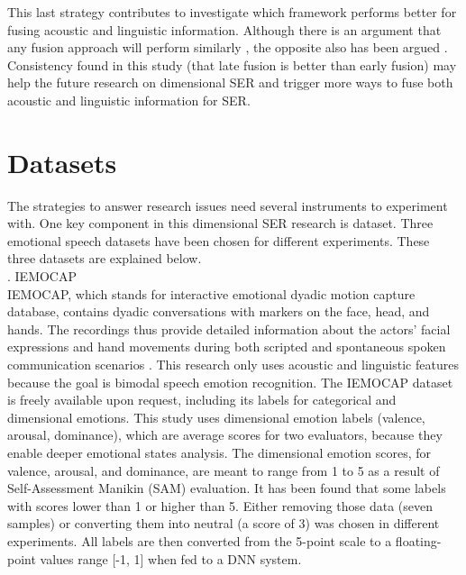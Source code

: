 {This last strategy contributes to investigate which framework performs better
for fusing acoustic and linguistic information. Although there is an argument
that any fusion approach will perform similarly \cite{Pepino2020}, the opposite
also has been argued \cite{Planet2012}. Consistency found in this study (that
late fusion is better than early fusion) may help the future research on
dimensional SER and trigger more ways to fuse both acoustic and linguistic
information for SER.

\section{Datasets}
The strategies to answer research issues need several instruments to experiment
with. One key component in this dimensional SER research is dataset. Three
emotional speech datasets have been chosen for different experiments. These
three datasets are explained below. \\

. IEMOCAP \\
IEMOCAP, which stands for interactive emotional dyadic motion capture database,
contains dyadic conversations with markers on the face, head, and hands. The
recordings thus provide detailed information about the actors' facial
expressions and hand movements during both scripted and spontaneous spoken
communication scenarios \cite{Busso2008}. This research only uses acoustic and
linguistic features because the goal is bimodal speech emotion recognition. The
IEMOCAP dataset is freely available upon request, including its labels for
categorical and dimensional emotions. This study uses dimensional emotion labels
(valence, arousal, dominance), which are average scores for two evaluators,
because they enable deeper emotional states analysis. The dimensional emotion
scores, for valence, arousal, and dominance, are meant to range from 1 to 5 as
a result of Self-Assessment Manikin (SAM) evaluation. It has been found that
some labels with scores lower than 1 or higher than 5. Either removing those
data (seven samples) or converting them into neutral (a score of 3) was chosen
in different experiments.  All labels are then converted from the 5-point scale
to a floating-point values range [-1, 1] when fed to a DNN system.

}
